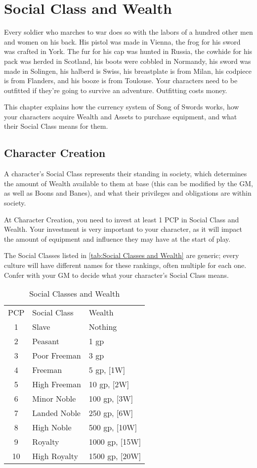 \documentclass[oneside,11pt,english]{book}
\begin{document}
\chapter{Social Class and Wealth}\label{ch:wealth}
\startcontents[chapters]
\clearpage
Every soldier who marches to war does so with the labors of a hundred other men and women on his back. His pistol was made in Vienna, the frog for his sword was crafted in York. The fur for his cap was hunted in Russia, the cowhide for his pack was herded in Scotland, his boots were cobbled in Normandy, his sword was made in Solingen, his halberd is Swiss, his breastplate is from Milan, his codpiece is from Flanders, and his booze is from Toulouse. Your characters need to be outfitted if they’re going to survive an adventure. Outfitting costs money.


This chapter explains how the currency system of Song of Swords works, how your characters acquire 
Wealth and Assets to purchase equipment, and what their Social Class means for them. 
\section{Character Creation}
A character’s Social Class represents their standing in society, which determines the amount of Wealth available to them at base (this can be modified by the GM, as well as Boons and Banes), and what their privileges and obligations are within society.


At Character Creation, you need to invest at least 1 PCP in Social Class and Wealth. Your investment is very important to your character, as it will impact the amount of equipment and influence they may have at the start of play.


The Social Classes listed in \autoref{tab:Social Classes and Wealth} are generic; every culture will have different names for these 
rankings, often multiple for each one. Confer with your GM to decide what your character’s Social Class 
means.
\begin{wraptable}{r}{7.5 cm}
	\centering
	\caption{Social Classes and Wealth}
	\label{tab:Social Classes and Wealth}
	\begin{tabu} spread 0pt{cXX}
PCP		&Social Class	&Wealth\\
1		&Slave			&Nothing\\
2		&Peasant		&1 gp\\
3		&Poor Freeman	&3 gp\\
4		&Freeman		&5 gp, [1W]\\
5		&High Freeman	&10 gp, [2W]\\
6		&Minor Noble	&100 gp, [3W]\\
7		&Landed Noble	&250 gp, [6W]\\
8		&High Noble		&500 gp, [10W]\\
9		&Royalty		&1000 gp, [15W]\\
10		&High Royalty	&1500 gp, [20W]\\
	\end{tabu}
\end{wraptable}
\end{document}
